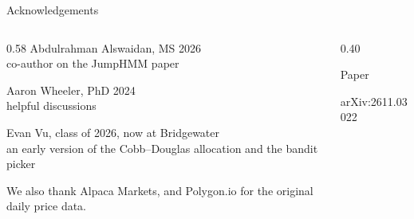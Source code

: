 \begin{frame}{Acknowledgements}
  \vspace{0.8em}
  \begin{columns}[T,onlytextwidth]
    \begin{column}{0.58\textwidth}
      {\vnmedium\color{vnslideink} Abdulrahman Alswaidan}, MS 2026\\
      {\small co-author on the JumpHMM paper}\par
      \vspace{0.9em}
      {\vnmedium\color{vnslideink} Aaron Wheeler}, PhD 2024\\
      {\small helpful discussions}\par
      \vspace{0.9em}
      {\vnmedium\color{vnslideink} Evan Vu}, class of 2026, now at Bridgewater\\
      {\small an early version of the Cobb–Douglas allocation and the bandit picker}\par
      \vspace{1.4em}
      We also thank Alpaca Markets, and Polygon.io for the original daily price data.
    \end{column}
    \begin{column}{0.40\textwidth}
      \centering
      \hypersetup{urlcolor=vnslidebody}
      \setlength{\fboxsep}{4pt}
      \begin{minipage}[t]{0.47\linewidth}
        \centering
        {\small\color{vnslideink}\strut Paper}\par\vspace{0.5em}
        \colorbox{vnbg}{}\par\vspace{0.5em}
        {\fontsize{7}{8.4}\selectfont\color{vnquiet} arXiv:2611.03022\par}

\end{minipage}
\end{column}
\end{columns}
\end{frame}

